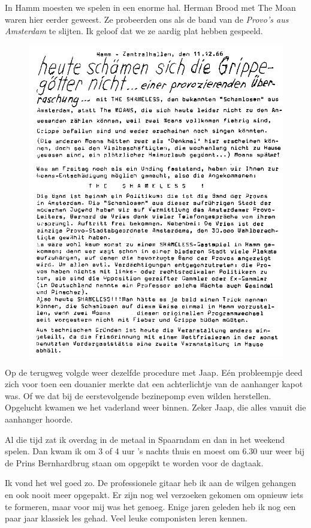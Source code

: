 \documentclass[10pt,twoside, openright]{memoir}
\begin{document}
In Hamm moesten we spelen in een enorme hal. Herman Brood met The Moan waren hier eerder geweest. Ze probeerden ons als de band van de \emph{Provo’s aus Amsterdam} te slijten. Ik geloof dat we ze aardig plat hebben gespeeld.

\begin{figure}
\includegraphics[width=\textwidth]{img/ch30/schamensich}
\end{figure}

Op de terugweg volgde weer dezelfde procedure met Jaap. Eén probleempje deed zich voor toen een douanier merkte dat een achterlichtje van de aanhanger kapot was. Of we dat bij de eerstevolgende bezinepomp even wilden herstellen. Opgelucht kwamen we het vaderland weer binnen. Zeker Jaap, die alles vanuit die aanhanger hoorde.

Al die tijd zat ik overdag in de metaal in Spaarndam en dan in het weekend spelen. Dan kwam ik om 3 of 4 uur ’s nachts thuis en moest om 6.30 uur weer bij de Prins Bernhardbrug staan om opgepikt te worden voor de dagtaak. 

Ik vond het wel goed zo. De professionele gitaar heb ik aan de wilgen gehangen en ook nooit meer opgepakt. Er zijn nog wel verzoeken gekomen om opnieuw iets te formeren, maar voor mij was het genoeg. Enige jaren geleden heb ik nog een paar jaar klassiek les gehad. Veel leuke componisten leren kennen.
\end{document}
